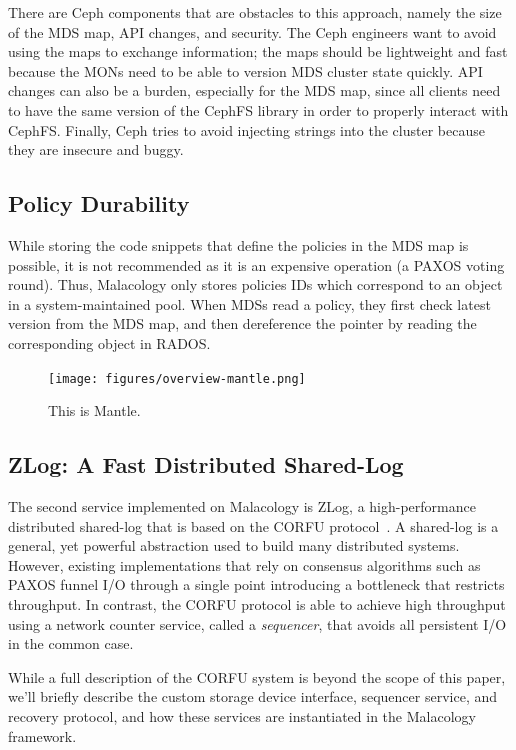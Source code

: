\documentclass[10pt,twocolumn]{article}
\begin{document}
There are Ceph components that are obstacles to this approach, namely the size of the  MDS map, API changes, and security. The Ceph engineers want to avoid using the maps to exchange information; the maps should be lightweight and fast because the MONs need to be able to version MDS cluster state quickly. API changes can also be a burden, especially for the MDS map, since all clients need to have the same version of the CephFS library in order to properly interact with CephFS. Finally, Ceph tries to avoid injecting strings into the cluster because they are insecure and buggy. 

\subsection{Policy Durability}

While storing the code snippets that define the policies in the MDS map is 
possible, it is not recommended as it is an expensive operation (a PAXOS voting 
round). Thus, Malacology only stores policies IDs which correspond to an object 
in a system-maintained pool. When MDSs read a policy, they first check latest 
version from the MDS map, and then dereference the pointer by reading the 
corresponding object in RADOS.

\begin{figure}[htbp]
\centering
\texttt{[image: figures/overview-mantle.png]}
\caption{This is Mantle.}
\end{figure}

\subsection{ZLog: A Fast Distributed Shared-Log}
\label{sec:zlog}

The second service implemented on Malacology is ZLog, a high-performance
distributed shared-log that is based on the CORFU
protocol~\cite{balakrishnan_corfu_2012}. A
shared-log is a general, yet powerful abstraction used to build many
distributed systems. However, existing implementations that rely on consensus
algorithms such as PAXOS funnel I/O through a single point introducing a
bottleneck that restricts throughput. In contrast, the CORFU protocol is able
to achieve high throughput using a network counter service, called a 
\emph{sequencer}, that avoids all persistent I/O in the common case.

While a full description of the CORFU system is beyond the scope of this
paper, we'll briefly describe the custom storage device interface, sequencer
service, and recovery protocol, and how these services are instantiated in the
Malacology framework.
\end{document}
